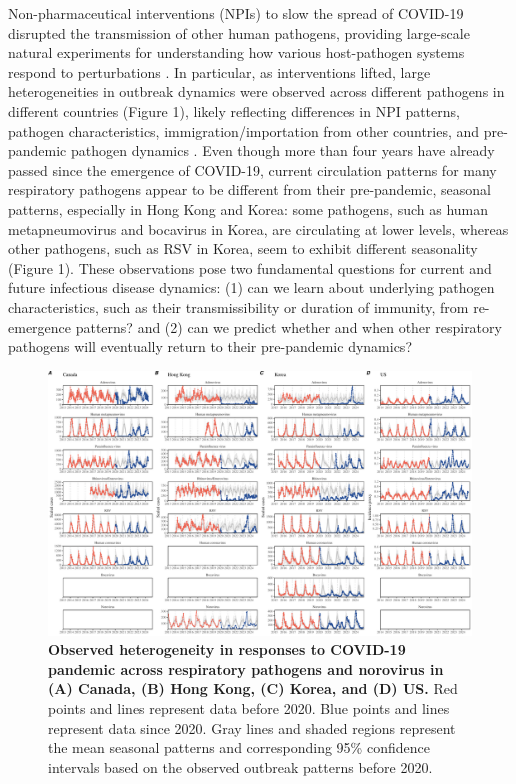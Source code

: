 \documentclass[12pt]{article}
\begin{document}
Non-pharmaceutical interventions (NPIs) to slow the spread of COVID-19 disrupted the transmission of other human pathogens, providing large-scale natural experiments for understanding how various host-pathogen systems respond to perturbations \citep{baker2020impact,gomez2021uncertain,koltai2022determinants,park2024predicting}.
In particular, as interventions lifted, large heterogeneities in outbreak dynamics were observed across different pathogens in different countries (Figure 1), likely reflecting differences in NPI patterns, pathogen characteristics, immigration/importation from other countries, and pre-pandemic pathogen dynamics \citep{chow2023effects}.
Even though more than four years have already passed since the emergence of COVID-19, current circulation patterns for many respiratory pathogens appear to be different from their pre-pandemic, seasonal patterns, especially in Hong Kong and Korea:
some pathogens, such as human metapneumovirus and bocavirus in Korea, are circulating at lower levels, whereas other pathogens, such as RSV in Korea, seem to exhibit different seasonality (Figure 1).
These observations pose two fundamental questions for current and future infectious disease dynamics: (1) can we learn about underlying pathogen characteristics, such as their transmissibility or duration of immunity, from re-emergence patterns? and (2) can we predict whether and when other respiratory pathogens will eventually return to their pre-pandemic dynamics?

\begin{figure}[!th]
\includegraphics[width=\textwidth]{../figure1/figure1.pdf}
\caption{
\textbf{Observed heterogeneity in responses to COVID-19 pandemic across respiratory pathogens and norovirus in (A) Canada, (B) Hong Kong, (C) Korea, and (D) US.}
Red points and lines represent data before 2020.
Blue points and lines represent data since 2020.
Gray lines and shaded regions represent the mean seasonal patterns and corresponding 95\% confidence intervals based on the observed outbreak patterns before 2020.
}
\end{figure} 
\end{document}
